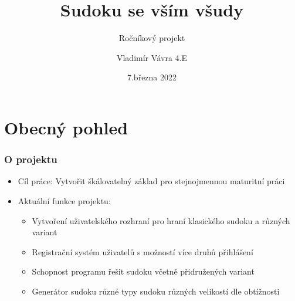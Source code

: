 \documentclass[aspectratio=43]{beamer}
\title{Sudoku se vším všudy}
\subtitle{Ročníkový projekt}
\author{Vladimír Vávra 4.E}
\date{7.března 2022}
\institute{Gymnázium, Praha 6, Arabská 14}
\begin{document}
\begin{frame}[plain]
	\maketitle
\end{frame}

\clearpage
\setcounter{framenumber}{0}

\section{Obecný pohled}
\begin{frame}[fragile]
	\frametitle{O projektu}
	\begin{itemize}
		\item Cíl práce: Vytvořit škálovatelný základ pro stejnojmennou maturitní
		      práci
		\item Aktuální funkce projektu:
		      \begin{itemize}
			      \item Vytvoření uživatelského rozhraní pro hraní klasického sudoku a
			            různých variant
			      \item Registrační systém uživatelů s možností více druhů přihlášení
			      \item Schopnost programu řešit sudoku včetně přidružených variant
			      \item Generátor sudoku různé typy sudoku různých velikostí dle
			            obtížnosti
		      \end{itemize}
	\end{itemize}
\end{frame}
\end{document}
